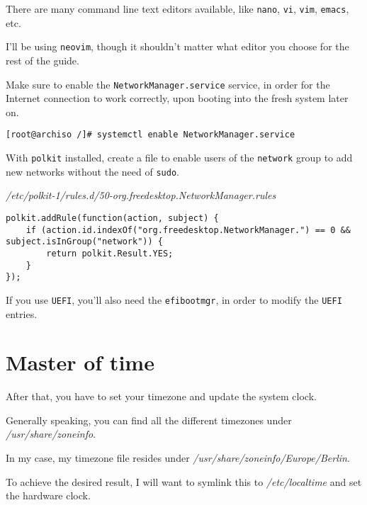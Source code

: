\documentclass[10pt]{dustdoc}
\begin{document}
\begin{NOTE}
    There are many command line text editors available, like \texttt{nano}, \texttt{vi}, \texttt{vim}, \texttt{emacs}, etc.

    I’ll be using \texttt{neovim}, though it shouldn’t matter what editor you choose for the rest of the guide.
\end{NOTE}

Make sure to enable the \texttt{NetworkManager.service} service, in order for the Internet connection to work correctly, upon booting into the fresh system later on.

\begin{verbatim}
[root@archiso /]# systemctl enable NetworkManager.service
\end{verbatim}

With \texttt{polkit} installed, create a file to enable users of the \texttt{network} group to add new networks without the need of \texttt{sudo}.

\begin{mintedlisting}
    \caption*{\textit{/etc/polkit-1/rules.d/\allowbreak{}50-org.freedesktop.\allowbreak{}NetworkManager.rules}}
    \begin{verbatim}
polkit.addRule(function(action, subject) {
    if (action.id.indexOf("org.freedesktop.NetworkManager.") == 0 && subject.isInGroup("network")) {
        return polkit.Result.YES;
    }
});
    \end{verbatim}
\end{mintedlisting}

If you use \texttt{UEFI}, you’ll also need the \texttt{efibootmgr}, in order to modify the \texttt{UEFI} entries.

\section{Master of time}
\label{sec:master-of-time}

After that, you have to set your timezone and update the system clock.

Generally speaking, you can find all the different timezones under \textit{/usr/\allowbreak{}share/\allowbreak{}zoneinfo}.

In my case, my timezone file resides under \textit{/usr/\allowbreak{}share/\allowbreak{}zoneinfo/\allowbreak{}Europe/\allowbreak{}Berlin}.

To achieve the desired result, I will want to symlink this to \textit{/etc/localtime} and set the hardware clock.
\end{document}
